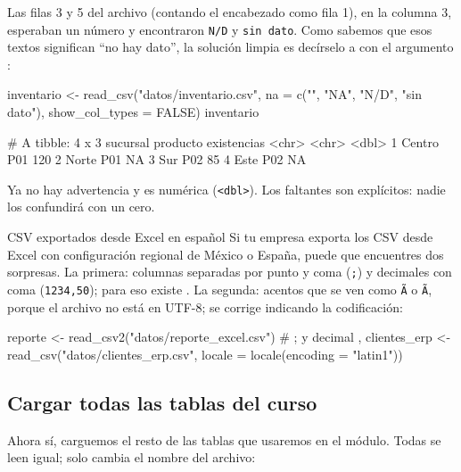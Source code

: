 Las filas 3 y 5 del archivo (contando el encabezado como fila 1), en la
columna 3, esperaban un número y encontraron \texttt{N/D} y
\texttt{sin dato}. Como sabemos que esos textos significan ``no hay dato'',
la solución limpia es decírselo a  con el argumento
:

\begin{rcode}
inventario <- read_csv("datos/inventario.csv",
                       na = c("", "NA", "N/D", "sin dato"),
                       show_col_types = FALSE)
inventario
\end{rcode}
\begin{rsalida}
# A tibble: 4 x 3
  sucursal producto existencias
  <chr>    <chr>          <dbl>
1 Centro   P01              120
2 Norte    P01               NA
3 Sur      P02               85
4 Este     P02               NA
\end{rsalida}

Ya no hay advertencia y  es numérica
(\texttt{<dbl>}). Los faltantes son explícitos: nadie los confundirá con
un cero.

\begin{negocio}{CSV exportados desde Excel en español}
Si tu empresa exporta los CSV desde Excel con configuración regional de
México o España, puede que encuentres dos sorpresas. La primera: columnas
separadas por punto y coma (\texttt{;}) y decimales con coma
(\texttt{1234,50}); para eso existe . La segunda:
acentos que se ven como \texttt{\~{A}\textcopyright} o
\texttt{\~{A}\textpm}, porque el archivo no está
en UTF-8; se corrige indicando la codificación:
\begin{rnoejecutar}
reporte <- read_csv2("datos/reporte_excel.csv")      # ; y decimal ,
clientes_erp <- read_csv("datos/clientes_erp.csv",
                         locale = locale(encoding = "latin1"))
\end{rnoejecutar}
\end{negocio}

\subsection{Cargar todas las tablas del curso}

Ahora sí, carguemos el resto de las tablas que usaremos en el módulo. Todas
se leen igual; solo cambia el nombre del archivo:

